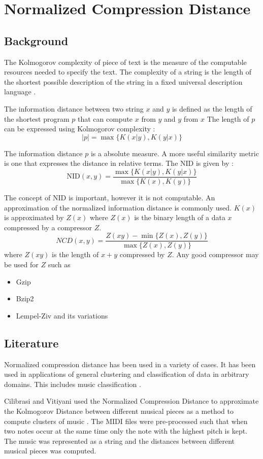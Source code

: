 \section{Normalized Compression Distance} \label{sec:class_ncd}
\subsection{Background}
The Kolmogorov complexity of piece of text is the measure of the computable resources needed to specify the text. The complexity of a string is the length of the shortest possible description of the string in a fixed universal description language \cite{Kolmogorov1998387}.

The information distance between two string $x$ and $y$ is defined as the length of the shortest program $p$ that can compute $x$ from $y$ and $y$ from $x$
The length of $p$ can be expressed using Kolmogorov complexity \cite{681318}:
\[ |p| = \max\{K(x|y), K(y|x)\}  \]

The information distance $p$ is a absolute measure. A more useful similarity metric is one that expresses the distance in relative terms. 
The \ac{NID} is given by \cite{1362909} : 
\[ \text{NID}(x,y) = \frac{\max\{K(x|y),K(y|x)\}}{\max\{K(x),K(y)\}} \]

The concept of \ac{NID} is important, however it is not computable. 
An approximation of the normalized information distance is commonly used.  $K(x)$ is approximated by $Z(x)$ where $Z(x)$ is the binary length of a data $x$ compressed by a compressor $Z$.
\[NCD(x,y) = \frac{Z(xy) - \min\{ Z(x), Z(y) \}}{\max\{ Z(x), Z(y) \}} \]
where $Z(xy)$ is the length of $x+y$ compressed by $Z$. 
Any good compressor may be used for $Z$ such as 
\begin{itemize}
\item Gzip
\item Bzip2
\item Lempel-Ziv and its variations
\end{itemize}
\subsection{Literature}
Normalized compression distance has been used in a variety of cases. It has been used in applications of general clustering and classification of data in arbitrary domains. This includes music classification \cite{1412045}.

Cilibrasi and Vitiyani used the Normalized Compression Distance to approximate the Kolmogorov Distance between different musical pieces as a method to compute clusters of music \cite{1412045}. The \ac{MIDI} files were pre-processed such that when two notes occur at the same time only the note with the highest pitch is kept. The music was represented as a string and the distances between different musical pieces was computed.


